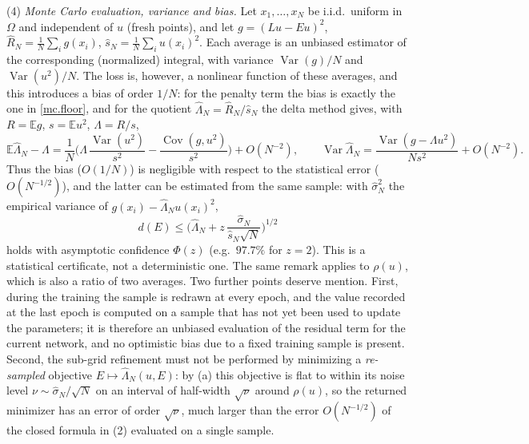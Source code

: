 \begin{remark}
(4) \emph{Monte Carlo evaluation, variance and bias.} Let $x_1,\dots,x_N$ be i.i.d.\
uniform in $\Omega$ and independent of $u$ (fresh points), and let
$g=(Lu-Eu)^2$, $\hat R_N=\frac1N\sum_ig(x_i)$, $\hat s_N=\frac1N\sum_iu(x_i)^2$. Each
average is an unbiased estimator of the corresponding (normalized) integral, with
variance $\operatorname{Var}(g)/N$ and $\operatorname{Var}(u^2)/N$. The loss is, however, a
nonlinear function of these averages, and this introduces a bias of order $1/N$:
for the penalty term the bias is exactly the one in \eqref{mc.floor}, and for the
quotient $\hat\Lambda_N=\hat R_N/\hat s_N$ the delta method gives, with $R=\mathbb E g$,
$s=\mathbb E u^2$, $\Lambda=R/s$,
\[
\mathbb E\hat\Lambda_N-\Lambda=\frac1N\Big(\Lambda\,\frac{\operatorname{Var}(u^2)}{s^2}
-\frac{\operatorname{Cov}(g,u^2)}{s^2}\Big)+O(N^{-2}),
\qquad
\operatorname{Var}\hat\Lambda_N=\frac{\operatorname{Var}(g-\Lambda u^2)}{Ns^2}+O(N^{-2}).
\]
Thus the bias ($O(1/N)$) is negligible with respect to the statistical error
($O(N^{-1/2})$), and the latter can be estimated from the same sample: with
$\hat\sigma_N^2$ the empirical variance of $g(x_i)-\hat\Lambda_Nu(x_i)^2$,
\[
d(E)\le\Big(\hat\Lambda_N+z\,\frac{\hat\sigma_N}{\hat s_N\sqrt N}\Big)^{1/2}
\]
holds with asymptotic confidence $\Phi(z)$ (e.g.\ $97.7\%$ for $z=2$). This is a
statistical certificate, not a deterministic one. The same remark applies to
$\rho(u)$, which is also a ratio of two averages. Two further points deserve mention.
First, during the training the sample is redrawn at every epoch, and the value recorded
at the last epoch is computed on a sample that has not yet been used to update the
parameters; it is therefore an unbiased evaluation of the residual term for the current
network, and no optimistic bias due to a fixed training sample is present. Second, the
sub-grid refinement must not be performed by minimizing a \emph{re-sampled} objective
$E\mapsto\hat\Lambda_N(u,E)$: by (a) this objective is flat to within its noise level
$\nu\sim\hat\sigma_N/\sqrt N$ on an interval of half-width $\sqrt\nu$ around $\rho(u)$,
so the returned minimizer has an error of order $\sqrt\nu$, much larger than the error
$O(N^{-1/2})$ of the closed formula in (2) evaluated on a single sample.
\end{remark}



